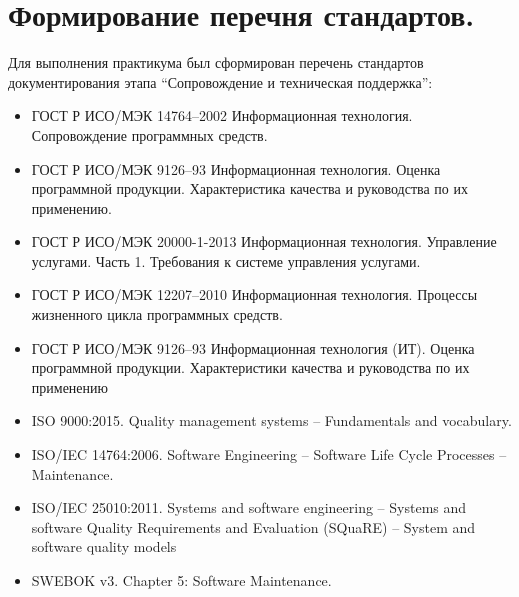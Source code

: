 
\pagebreak


\section{Формирование перечня стандартов.}

Для выполнения практикума был сформирован перечень стандартов документирования этапа \enquote{Сопровождение и техническая поддержка}:

\begin{itemize}
    \item ГОСТ Р ИСО/МЭК 14764--2002 Информационная технология.
    Сопровождение программных средств.

    \item ГОСТ Р ИСО/МЭК 9126--93 Информационная технология.
    Оценка программной продукции.
    Характеристика качества и руководства по их применению.

    \item ГОСТ Р ИСО/МЭК 20000-1-2013 Информационная технология.
    Управление услугами.
    Часть 1.
    Требования к системе управления услугами.

    \item ГОСТ Р ИСО/МЭК 12207--2010 Информационная технология.
    Процессы жизненного цикла программных средств.

    \item ГОСТ Р ИСО/МЭК 9126--93 Информационная технология (ИТ).
    Оценка программной продукции.
    Характеристики качества и руководства по их применению

    \item ISO 9000:2015.
    Quality management systems -- Fundamentals and vocabulary.

    \item ISO/IEC 14764:2006.
    Software Engineering -- Software Life Cycle Processes -- Maintenance.

    \item ISO/IEC 25010:2011.
    Systems and software engineering --
    Systems and software Quality Requirements and Evaluation (SQuaRE) --
    System and software quality models

    \item SWEBOK v3.
    Chapter 5: Software Maintenance.
\end{itemize}

